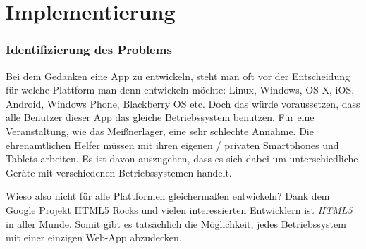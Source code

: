 \chapter{Implementierung}




\subsection{Identifizierung des Problems}
Bei dem Gedanken eine App zu entwickeln, steht man oft vor der Entscheidung für welche Plattform man denn entwickeln möchte: Linux, Windows, OS X, iOS, Android, Windows Phone, Blackberry OS etc. Doch das würde voraussetzen, dass alle Benutzer dieser App das gleiche Betriebssystem benutzen. Für eine Veranstaltung, wie das Meißnerlager, eine sehr schlechte Annahme. Die ehrenamtlichen Helfer müssen mit ihren eigenen / privaten Smartphones und Tablets arbeiten. Es ist davon auszugehen, dass es sich dabei um unterschiedliche Geräte mit verschiedenen Betriebssystemen handelt.\par

Wieso also nicht für alle Plattformen gleichermaßen entwickeln? Dank dem Google Projekt \glqq HTML5 Rocks\grqq{}\cite{html5rocksmain} und vielen interessierten Entwicklern ist \emph{HTML5} in aller Munde. Somit gibt es tatsächlich die Möglichkeit, jedes Betriebssystem mit einer einzigen Web-App abzudecken.

